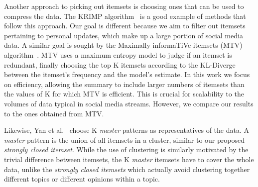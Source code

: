 \documentclass{sig-alternate}
\begin{document}
Another approach to picking out itemsets is choosing ones that 
can be used to compress the data. The KRIMP algorithm~\cite{vreeken2011krimp} is 
a good example of methods that follow this approach. Our goal is different because
we aim to filter out itemsets pertaining to personal updates, which make up a large
portion of social media data. 
A similar goal is sought by the Maximally informaTiVe itemsets (MTV) algorithm~\cite{mampaey2011tell}. 
MTV uses a maximum entropy model to judge if an itemset is redundant, finally choosing the
top K itemsets according to the KL-Diverge between the itemset's  frequency and  the model's estimate. 
In this work we focus on efficiency, allowing the summary to include larger numbers
of itemsets than the values of K for which MTV is efficient.
This is crucial for scalability to the volumes of data typical in social media streams.
However, we compare our results to the ones obtained from MTV.

Likewise, Yan et al.~\cite{yan2005summarizing} choose 
K \emph{master} patterns as representatives of the data. 
A \emph{master} pattern is the union of all itemsets in a 
cluster, similar to our proposed \emph{strongly closed itemset}. 
While the use of clustering is similarly motivated by 
the trivial difference between itemsets, 
the K \emph{master} itemsets  have to cover the whole data, 
unlike the \emph{strongly closed itemsets} which actually 
avoid clustering together different topics or different opinions within a topic.

\end{document}
